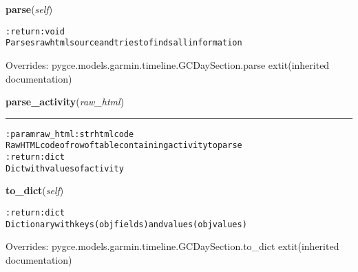     \vspace{0.5ex}

\hspace{.8\funcindent}\begin{boxedminipage}{\funcwidth}

    \raggedright \textbf{parse}(\textit{self})

\setlength{\parskip}{2ex}
\begin{alltt}

:return: void
    Parses raw html source and tries to finds all information
\end{alltt}

\setlength{\parskip}{1ex}
      Overrides: pygce.models.garmin.timeline.GCDaySection.parse 	extit{(inherited documentation)}

    \end{boxedminipage}

    \label{pygce:models:garmin:timeline:GCDayActivities:parse_activity}

    \vspace{0.5ex}

\hspace{.8\funcindent}\begin{boxedminipage}{\funcwidth}

    \raggedright \textbf{parse\_activity}(\textit{raw\_html})

    \vspace{-1.5ex}

    \rule{\textwidth}{0.5\fboxrule}
\setlength{\parskip}{2ex}
\begin{alltt}

:param raw\_html: str html code
    Raw HTML code of row of table containing activity to parse
:return: dict
    Dict with values of activity
\end{alltt}

\setlength{\parskip}{1ex}
    \end{boxedminipage}

    \vspace{0.5ex}

\hspace{.8\funcindent}\begin{boxedminipage}{\funcwidth}

    \raggedright \textbf{to\_dict}(\textit{self})

\setlength{\parskip}{2ex}
\begin{alltt}

:return: dict
    Dictionary with keys (obj fields) and values (obj values)
\end{alltt}

\setlength{\parskip}{1ex}
      Overrides: pygce.models.garmin.timeline.GCDaySection.to\_dict 	extit{(inherited documentation)}

    \end{boxedminipage}

